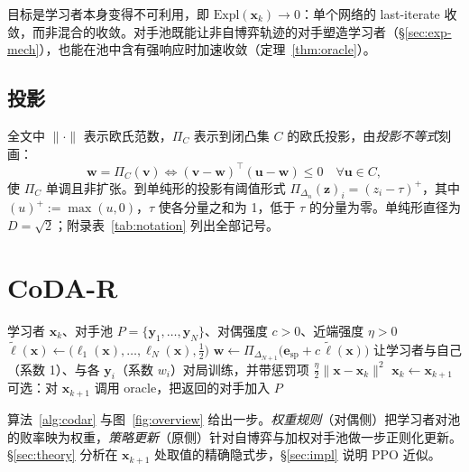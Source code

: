 \documentclass{article}
\theoremstyle{plain}
\theoremstyle{remark}
\newcommand{\Expl}{\mathrm{Expl}}
\newcommand{\Proj}{\Pi}
\newcommand{\simplex}{\Delta}
\newcommand{\bx}{{\bm{x}}}
\newcommand{\by}{{\bm{y}}}
\newcommand{\bv}{{\bm{v}}}
\newcommand{\bw}{{\bm{w}}}
\newcommand{\bz}{{\bm{z}}}
\newcommand{\bu}{{\bm{u}}}
\newcommand{\be}{{\bm{e}}}
\newcommand{\bell}{{\bm{\ell}}}
\newcommand{\aug}{\tilde{\bell}}
\newcommand{\esp}{\be_{\mathrm{sp}}}
\newcommand{\codar}{CoDA-R}
\begin{document}
目标是学习者本身变得不可利用，即 $\Expl(\bx_k)\to0$：单个网络的 last-iterate 收敛，而非混合的收敛。对手池既能让非自博弈轨迹的对手塑造学习者（\S\ref{sec:exp-mech}），也能在池中含有强响应时加速收敛（定理~\ref{thm:oracle}）。

\subsection{投影}

全文中 $\|\cdot\|$ 表示欧氏范数，$\Proj_C$ 表示到闭凸集 $C$ 的欧氏投影，由\emph{投影不等式}刻画：
\begin{equation}
\bw=\Proj_C(\bv)\iff(\bv-\bw)^\top(\bu-\bw)\le0\quad\forall \bu\in C ,
\label{eq:obtuse}
\end{equation}
使 $\Proj_C$ 单调且非扩张\citep{bauschke2011convex}。到单纯形的投影有阈值形式 $\Proj_{\simplex_n}(\bz)_i=(z_i-\tau)^+$，其中 $(u)^+:=\max(u,0)$，$\tau$ 使各分量之和为 1，低于 $\tau$ 的分量为零\citep{duchi2008projection}。单纯形直径为 $D=\sqrt2$；附录表~\ref{tab:notation} 列出全部记号。


\section{\codar{}}
\label{sec:alg}

\begin{algorithm}[t]
\caption{精确 \codar{} 的一步。}
\label{alg:codar}
\begin{algorithmic}[1]
\Require 学习者 $\bx_k$、对手池 $P=\{\by_1,\dots,\by_N\}$、对偶强度 $c>0$、近端强度 $\eta>0$
\State $\aug(\bx)\leftarrow\big(\ell_1(\bx),\dots,\ell_N(\bx),\tfrac12\big)$ 
\State $\bw\leftarrow\Proj_{\simplex_{N+1}}\big(\esp+c\,\aug(\bx)\big)$ 
\State 让学习者与自己（系数 1）、与各 $\by_i$（系数 $w_i$）对局训练，并带惩罚项 $\tfrac\eta2\|\bx-\bx_k\|^2$ 
\State $\bx_k\leftarrow\bx_{k+1}$ 
\State 可选：对 $\bx_{k+1}$ 调用 oracle，把返回的对手加入 $P$
\end{algorithmic}
\end{algorithm}

算法~\ref{alg:codar} 与图~\ref{fig:overview} 给出一步。\emph{权重规则}（对偶侧）把学习者对池的败率映为权重，\emph{策略更新}（原侧）针对自博弈与加权对手池做一步正则化更新。\S\ref{sec:theory} 分析在 $\bx_{k+1}$ 处取值的精确隐式步，\S\ref{sec:impl} 说明 PPO 近似。
\end{document}
